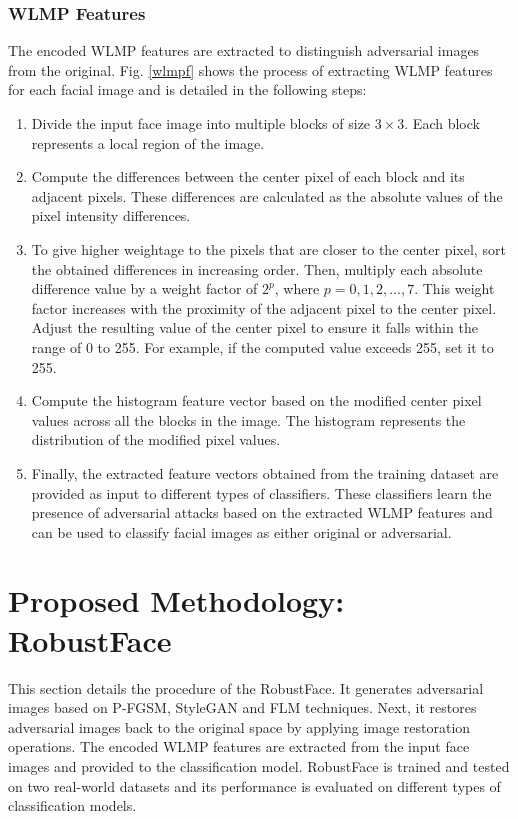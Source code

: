 \documentclass[sn-mathphys]{sn-jnl}%
\theoremstyle{thmstyleone}%
\theoremstyle{thmstyletwo}%
\theoremstyle{thmstylethree}%
\begin{document}
\subsubsection{WLMP Features}
The encoded WLMP features are extracted to distinguish adversarial images from the original. Fig. \ref{wlmpf} shows the process of extracting WLMP features for each facial image and is detailed in the following steps:
\begin{enumerate}
 \item Divide the input face image into multiple blocks of size $3 \times 3$. Each block represents a local region of the image.

  \item Compute the differences between the center pixel of each block and its adjacent pixels. These differences are calculated as the absolute values of the pixel intensity differences.
  \item To give higher weightage to the pixels that are closer to the center pixel, sort the obtained differences in increasing order. Then, multiply each absolute difference value by a weight factor of $2^p$, where $p = 0, 1, 2, ..., 7$. This weight factor increases with the proximity of the adjacent pixel to the center pixel. Adjust the resulting value of the center pixel to ensure it falls within the range of 0 to 255. For example, if the computed value exceeds 255, set it to 255.
  \item Compute the histogram feature vector based on the modified center pixel values across all the blocks in the image. The histogram represents the distribution of the modified pixel values.
  \item Finally, the extracted feature vectors obtained from the training dataset are provided as input to different types of classifiers. These classifiers learn the presence of adversarial attacks based on the extracted WLMP features and can be used to classify facial images as either original or adversarial.
\end{enumerate}

\section{Proposed Methodology: RobustFace}
This section details the procedure of the RobustFace. It generates adversarial images based on P-FGSM, StyleGAN and FLM techniques. Next, it restores adversarial images back to the original space by applying image restoration operations. The encoded WLMP features are extracted from the input face images and provided to the classification model.  RobustFace is trained and tested on two real-world datasets and its performance is evaluated on different types of classification models.
\end{document}
